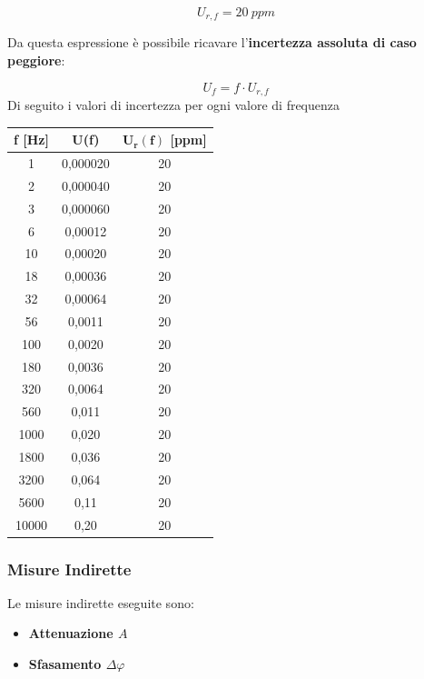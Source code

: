 \[U_{r,f} = 20 \ ppm\]

Da questa espressione è possibile ricavare l'\textbf{incertezza assoluta di caso peggiore}:

\[U_f = f \cdot U_{r,f}\]
Di seguito i valori di incertezza per ogni valore di frequenza 

\begin{table}[!ht]
    \centering
    \begin{tabular}{|c|c|c|}
    \hline

        \textbf{f [Hz]} & \textbf{U(f)} & $\bm{U_r(f)}$ [ppm] \\ \hline

        1 & 0,000020 & 20 \\ \hline
        2 & 0,000040 & 20 \\ \hline
        3 & 0,000060 & 20 \\ \hline
        6 & 0,00012 & 20 \\ \hline
        10 & 0,00020 & 20 \\ \hline
        18 & 0,00036 & 20 \\ \hline
        32 & 0,00064 & 20 \\ \hline
        56 & 0,0011 & 20 \\ \hline
        100 & 0,0020 & 20 \\ \hline
        180 & 0,0036 & 20 \\ \hline
        320 & 0,0064 & 20 \\ \hline
        560 & 0,011 & 20 \\ \hline
        1000 & 0,020 & 20 \\ \hline
        1800 & 0,036 & 20 \\ \hline
        3200 & 0,064 & 20 \\ \hline
        5600 & 0,11 & 20 \\ \hline
        10000 & 0,20 & 20 \\ \hline
    \end{tabular}
\end{table}

\FloatBarrier
\clearpage


\subsubsection{Misure Indirette}

Le misure indirette eseguite sono:
\begin{itemize}
    \item \textbf{Attenuazione $A$}
    \item \textbf{Sfasamento $\Delta \varphi$}
\end{itemize}


